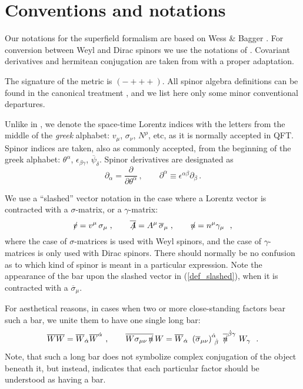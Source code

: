 \documentclass[a4paper,12pt]{article}
\newcommand{\slashed}[1]{\hbox{{$#1$}\llap{$/$}}}
\begin{document}
\appendix
\section{Conventions and notations}
\label{app_conventions}

	Our notations for the superfield formalism are based on 
	Wess \& Bagger 
\cite{Wess:1992cp}.
	For conversion between Weyl and Dirac spinors we use the notations
	of 
\cite{Martin:1997ns}.
	Covariant derivatives and hermitean conjugation are taken from
\cite{Gates:1983nr}
	with a proper adaptation.

	The signature of the metric is 
$ (-+++) $.
	All spinor algebra definitions can be found in the canonical treatment
\cite{Wess:1992cp},
	and we list here only some minor conventional departures.

	Unlike in \cite{Wess:1992cp}, we denote the space-time Lorentz
	indices with the letters from the middle of the \emph{greek}
	alphabet:
	$ v_\mu $, $ \sigma_\nu $, $ N^\rho $, etc,
	as it is normally accepted in QFT.
	Spinor indices are taken, also as commonly accepted, from the
	beginning of the greek alphabet:
	$ \theta^\alpha $, $ \epsilon_{\beta\gamma} $, 
	$ \overline{\psi}_{\dot\delta}$.
	Spinor derivatives are designated as
\[
	\partial_\alpha = \frac{\partial}{\partial\theta^\alpha}\,,
	\qquad
	\partial^\alpha \equiv \epsilon^{\alpha\beta}\partial_\beta
	\,.
\]

	We use a ``slashed'' vector notation in the case where a Lorentz
	vector is contracted with a $ \sigma $-matrix, or a $ \gamma $-matrix:
\begin{equation}
\label{def_slashed}
	\slashed{v} = v^\mu\, \sigma_\mu\;, \qquad
	\overline{\slashed{A}} = A^\mu\, \overline{\sigma}_\mu\;, \qquad
	\slashed{n} = n^\mu \gamma_\mu~~,
\end{equation}
	where the case of $ \sigma $-matrices is used with Weyl spinors, and
	the case of $ \gamma $-matrices is only used with Dirac spinors. 
	There should normally be no confusion as to which kind of spinor is
	meant in a particular expression.
	Note the appearance of the bar upon the slashed vector in
	(\ref{def_slashed}), when it
	is contracted with a $ \overline{\sigma}_\mu $.

	For aesthetical reasons, in cases when two or more close-standing
	factors bear such a bar, we unite them to have one single 
	long bar:
\[
	\overline{W W} = \overline{W}_{\dot\alpha}
			 \overline{W}^{\dot\alpha}~,
	\qquad
	\overline{W \sigma_{\mu\nu}\, \slashed{n}}\, W = 
		\overline{W}_{\dot\alpha}\,\, 
		\left(\overline{\sigma}_{\mu\nu}\right)
				^{\dot\alpha}_{~\dot\beta}\,\,
		\overline{\slashed{n}}^{\dot\beta \gamma}\,\,
		W_\gamma~
	~.
\]
	Note, that such a long bar does not symbolize complex conjugation
	of the object beneath it, but instead, indicates that each particular
	factor should be understood as having a bar.
\end{document}
